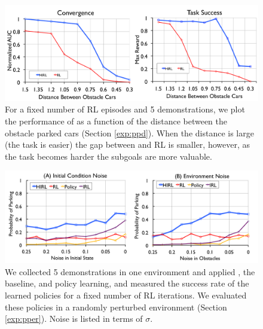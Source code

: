\begin{figure}[t]
\centering
 \includegraphics[width=\columnwidth]{exp/rc-env1.png}
 \caption{For a fixed number of RL episodes and 5 demonstrations, we plot the performance of \hirl as a function of the distance between the obstacle parked cars (Section \ref{exp:ppd}). 
 When the distance is large (the task is easier) the gap between \hirl and RL is smaller, however, as the task becomes harder the subgoals are more valuable. \label{exp:rcenv}}
\end{figure}

\begin{figure}[t]
\centering
 \includegraphics[width=\columnwidth]{exp/rc-env2.png}
 \caption{We collected 5 demonstrations in one environment and applied \hirl, the baseline, and policy learning, and measured the success rate of the learned policies for a fixed number of RL iterations. We evaluated these policies in a randomly perturbed  environment (Section \ref{exp:pper}). Noise is listed in terms of $\sigma$.\label{exp:rcenv2}}
\end{figure}

